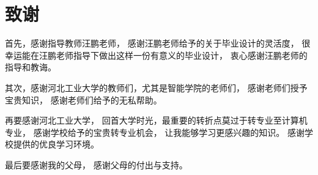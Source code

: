 \chapter*{致谢}

首先，感谢指导教师汪鹏老师，
感谢汪鹏老师给予的关于毕业设计的灵活度，
很幸运能在汪鹏老师指导下做出这样一份有意义的毕业设计，
衷心感谢汪鹏老师的指导和教诲。

其次，感谢河北工业大学的教师们，尤其是智能学院的老师们，
感谢老师们授予宝贵知识，
感谢老师们给予的无私帮助。

再要感谢河北工业大学，
回首大学时光，最重要的转折点莫过于转专业至计算机专业，
感谢学校给予的宝贵转专业机会，
让我能够学习更感兴趣的知识。
感谢学校提供的优良学习环境。

最后要感谢我的父母，
感谢父母的付出与支持。